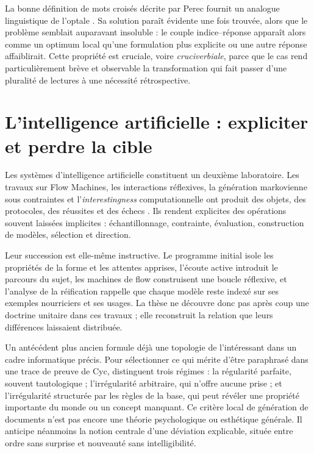 \documentclass[11pt,a4paper]{article}
\begin{document}
La bonne définition de mots croisés décrite par Perec fournit un analogue
linguistique de l'optale \parencite{perec1999motscroises}. Sa solution paraît
évidente une fois trouvée, alors que le problème semblait auparavant insoluble : le
couple indice--réponse apparaît alors comme un optimum local qu'une formulation
plus explicite ou une autre réponse affaiblirait. Cette propriété est cruciale,
voire \emph{cruciverbiale}, parce que le cas rend particulièrement brève et
observable la transformation qui fait passer d'une pluralité de lectures à une
nécessité rétrospective.

\section{L'intelligence artificielle : expliciter et perdre la cible}

Les systèmes d'intelligence artificielle constituent un deuxième laboratoire.
Les travaux sur Flow Machines, les interactions réflexives, la génération
markovienne sous contraintes et l'\emph{interestingness} computationnelle ont
produit des objets, des protocoles, des réussites et des échecs
\parencite{pachet1999surprising,pachet1999active,pachet1999programs,pachet2000melodie,
pachet2002continuatorinteraction,pachet2004flowmachines,pachet2004reification,
pachet2004cybernetic,pachet2004childrenreflect,addessi2005experiments,
pachet2006clefs,pachet2006creativity,pachet2006reflective,pachet2008machines,
jones2009stimulating,pachet2006interactionsreflexives,addessi2006flowmachine,
aucouturier2002similarity,pachetroy2008hitsong,pachet2011hitsong,
lerch2011closedloop,
milipachet1995regularity,pachet2012virtuosity,martin2016creativeprocess,
pachet2021assisted,pachet2026markov}.
Ils rendent explicites des opérations souvent laissées implicites :
échantillonnage, contrainte, évaluation, construction de modèles, sélection et
direction.

Leur succession est elle-même instructive. Le programme initial isole les
propriétés de la forme et les attentes apprises, l'écoute active introduit le
parcours du sujet, les machines de flow construisent une boucle réflexive, et
l'analyse de la réification rappelle que chaque modèle reste indexé sur ses
exemples nourriciers et ses usages. La thèse ne découvre donc pas après coup une
doctrine unitaire dans ces travaux ; elle reconstruit la relation que leurs
différences laissaient distribuée.

Un antécédent plus ancien formule déjà une topologie de l'intéressant dans un
cadre informatique précis. Pour sélectionner ce qui mérite d'être paraphrasé
dans une trace de preuve de Cyc, \textcite{milipachet1995regularity} distinguent
trois régimes : la régularité parfaite, souvent tautologique ; l'irrégularité
arbitraire, qui n'offre aucune prise ; et l'irrégularité structurée par les
règles de la base, qui peut révéler une propriété importante du monde ou un
concept manquant. Ce critère local de génération de documents n'est pas encore
une théorie psychologique ou esthétique générale. Il anticipe néanmoins la
notion centrale d'une déviation explicable, située entre ordre sans surprise et
nouveauté sans intelligibilité.
\end{document}
